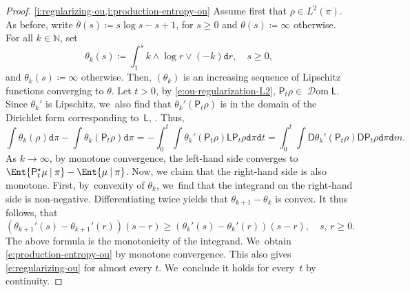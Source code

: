\documentclass[JEP,XML,SOM,Unicode,published]{cedram}
\theoremstyle{definition}
\theoremstyle{remark}
\newcommand{\given}[1][]{%
\nonscript\:#1\vert
\allowbreak
\nonscript\:
\mathopen{}}
\DeclareMathOperator{\dom}{\mathscr{D}om}
\begin{document}
\skpt
\begin{proof}
\cref{i:regularizing-ou,i:production-entropy-ou}
Assume first that $\rho \in L^{2}(\pi)$.
As before, write $\theta(s) \coloneq s \log s -s + 1$, for $s \geq 0$ and $\theta(s) \coloneq \infty$ otherwise.
For all $k \in \mathbb{N}$, set
\begin{equation}\label{e:theta-k}
\theta_{k}(s) \coloneq \int_{1}^{s} k \wedge \log r \vee (-k) \mathtt{d} r, \quad s \geq 0,
\end{equation}
and $\theta_{k}(s) \coloneq \infty$ otherwise.
Then, $(\theta_{k})$ is an increasing sequence of Lipschitz functions converging to $\theta$.
Let $t > 0$, by \cref{e:ou-regularization-L2}, $\mathsf{P}_{t}\rho \in \dom \mathsf{L}$.
Since $\theta_{k}'$ is Lipschitz, we~also find that $\theta_{k}'(\mathsf{P}_{t}\rho)$ is in the domain of the Dirichlet form corresponding to~$\mathsf{L}$, \eg \cite[Prop.\,3.3.1, p.\,14]{BouleauHirsch}.
Thus,
\begin{equation*}
\int \theta_{k}(\rho) \mathtt{d} \pi - \int \theta_{k}(\mathsf{P}_{t} \rho) \mathtt{d} \pi = - \int_{0}^{t} \int \theta_{k}'(\mathsf{P}_{t} \rho) \mathsf{L} \mathsf{P}_{t} \rho \mathtt{d} \pi \mathtt{d} t = \int_{0}^{t} \int \mathsf{D} \theta_{k}'(\mathsf{P}_{t} \rho) \mathsf{D} \mathsf{P}_{t} \rho \mathtt{d} \pi \mathtt{d} m.
\end{equation*}
As $k \to \infty$, by monotone convergence, the left-hand side converges to $\Ent{ \mathsf{P}_{t}^{\star} \mu \given \pi } - \Ent{ \mu \given \pi }$.
Now, we claim that the right-hand side is also monotone.
First, by~convexity of $\theta_{k}$, we~find that the integrand on the right-hand side is non-negative.
Differentiating twice yields that $\theta_{k+1} - \theta_{k}$ is convex.
It thus follows, that
\begin{equation}\label{e:theta-monotone-convex}
(\theta_{k+1}'(s) - \theta_{k+1}'(r))(s-r) \geq (\theta_{k}'(s) - \theta_{k}'(r))(s-r), \quad s,\, r \geq 0.
\end{equation}
The above formula is the monotonicity of the integrand. We~obtain \cref{e:production-entropy-ou} by monotone convergence.
This also gives \cref{e:regularizing-ou} for almost every $t$. We~conclude it holds for every~$t$ by continuity.


\end{proof}
\end{document}
